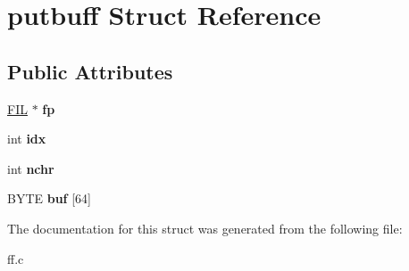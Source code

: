 \hypertarget{structputbuff}{}\section{putbuff Struct Reference}
\label{structputbuff}
\subsection*{Public Attributes}
\begin{DoxyCompactItemize}
\item 
\mbox{\label{structputbuff_a5c7baa85e569be17f4888f5d92f4453c}} 
\hyperlink{struct_f_i_l}{F\+IL} $\ast$ {\bfseries fp}
\item 
\mbox{\label{structputbuff_a10a3ca93af8df07e9836ebd5230c06d8}} 
int {\bfseries idx}
\item 
\mbox{\label{structputbuff_a125366bfe48077e6f562f95e30b4604a}} 
int {\bfseries nchr}
\item 
\mbox{\label{structputbuff_ae623199e5d2851f95050670170f20329}} 
B\+Y\+TE {\bfseries buf} \mbox{[}64\mbox{]}
\end{DoxyCompactItemize}


The documentation for this struct was generated from the following file\+:\begin{DoxyCompactItemize}
\item 
ff.\+c\end{DoxyCompactItemize}
